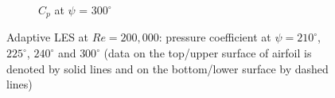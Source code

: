 \begin{figure}[H]
\begin{subfigure}[b]{0.475\textwidth}
		\caption{ $C_p$ at $\psi$ = $300^\circ$}
		\label{fig:zonal_Cp_Re200k_300}
	\end{subfigure}
	\caption{Adaptive LES at $Re=200,000$: pressure coefficient at $\psi=210^\circ$, $225^\circ$, $240^\circ$ and $300^\circ$ (data on the top/upper surface of airfoil is denoted by solid lines and on the bottom/lower surface by dashed lines)}
	\label{fig:zonal_Cp_Re200k_plots}
\end{figure}